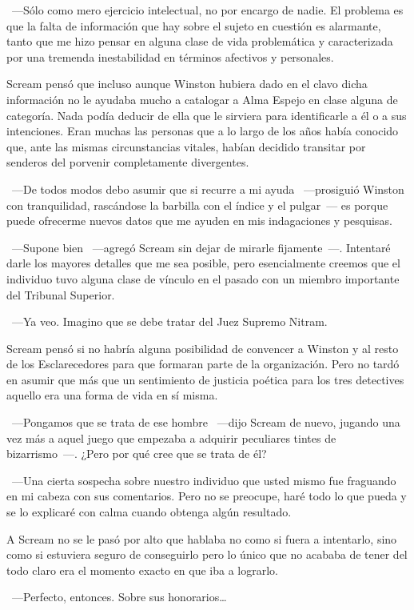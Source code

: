 ~---Sólo como mero ejercicio intelectual, no por encargo de nadie. El problema es que la falta de información que hay sobre el sujeto en cuestión es alarmante, tanto que me hizo pensar en alguna clase de vida problemática y caracterizada por una tremenda inestabilidad en términos afectivos y personales.

Scream pensó que incluso aunque Winston hubiera dado en el clavo dicha información no le ayudaba mucho a catalogar a Alma Espejo en clase alguna de categoría. Nada podía deducir de ella que le sirviera para identificarle a él o a sus intenciones. Eran muchas las personas que a lo largo de los años había conocido que, ante las mismas circunstancias vitales, habían decidido transitar por senderos del porvenir completamente divergentes.

~---De todos modos debo asumir que si recurre a mi ayuda ~---prosiguió Winston con tranquilidad, rascándose la barbilla con el índice y el pulgar~--- es porque puede ofrecerme nuevos datos que me ayuden en mis indagaciones y pesquisas.

~---Supone bien ~---agregó Scream sin dejar de mirarle fijamente~---. Intentaré darle los mayores detalles que me sea posible, pero esencialmente creemos que el individuo tuvo alguna clase de vínculo en el pasado con un miembro importante del Tribunal Superior.

~---Ya veo. Imagino que se debe tratar del Juez Supremo Nitram.

Scream pensó si no habría alguna posibilidad de convencer a Winston y al resto de los Esclarecedores para que formaran parte de la organización. Pero no tardó en asumir que más que un sentimiento de justicia poética para los tres detectives aquello era una forma de vida en sí misma.

~---Pongamos que se trata de ese hombre ~---dijo Scream de nuevo, jugando una vez más a aquel juego que empezaba a adquirir peculiares tintes de bizarrismo~---. ¿Pero por qué cree que se trata de él?

~---Una cierta sospecha sobre nuestro individuo que usted mismo fue fraguando en mi cabeza con sus comentarios. Pero no se preocupe, haré todo lo que pueda y se lo explicaré con calma cuando obtenga algún resultado.

A Scream no se le pasó por alto que hablaba no como si fuera a intentarlo, sino como si estuviera seguro de conseguirlo pero lo único que no acababa de tener del todo claro era el momento exacto en que iba a lograrlo.

~---Perfecto, entonces. Sobre sus honorarios\dots

